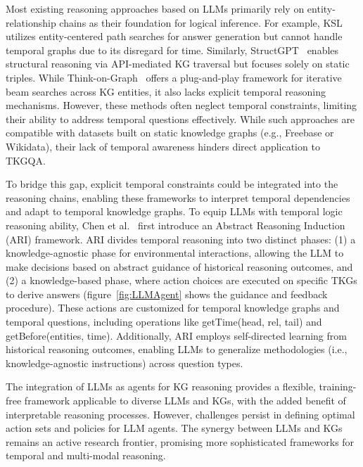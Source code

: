 Most existing reasoning approaches based on LLMs primarily rely on entity-relationship chains as their foundation for logical inference. For example,
KSL~\cite{fengKnowledgeSolverTeaching2023} utilizes entity-centered path searches for answer generation but cannot handle temporal graphs due to its disregard for time. Similarly, StructGPT~\cite{jiangStructGPTGeneralFramework2023a} enables structural reasoning via API-mediated KG traversal but focuses solely on static triples. While Think-on-Graph~\cite{sunThinkonGraphDeepResponsible2024} offers a plug-and-play framework for iterative beam searches across KG entities, it also lacks explicit temporal reasoning mechanisms. However, these methods often neglect temporal constraints, limiting their ability to address temporal questions effectively. While such approaches are compatible with datasets built on static knowledge graphs (e.g., Freebase or Wikidata), their lack of temporal awareness hinders direct application to TKGQA. 

To bridge this gap, explicit temporal constraints could be integrated into the reasoning chains, enabling these frameworks to interpret temporal dependencies and adapt to temporal knowledge graphs. 
To equip LLMs with temporal logic reasoning ability, Chen et al.~\cite{chen2023temporal,valero2023comparing} first introduce an Abstract Reasoning Induction (ARI) framework. ARI divides temporal reasoning into two distinct phases: (1) a knowledge-agnostic phase for environmental interactions, allowing the LLM to make decisions based on abstract guidance of historical reasoning outcomes, and (2) a knowledge-based phase, where action choices are executed on specific TKGs to derive answers (figure~\ref{fig:LLMAgent} shows the guidance and feedback procedure).
These actions are customized for temporal knowledge graphs and temporal questions, including operations like getTime(head, rel, tail) and getBefore(entities, time). 
Additionally, ARI employs self-directed learning from historical reasoning outcomes, enabling LLMs to generalize methodologies (i.e., knowledge-agnostic instructions) across question types.

The integration of LLMs as agents for KG reasoning provides a flexible, training-free framework applicable to diverse LLMs and KGs, with the added benefit of interpretable reasoning processes. However, challenges persist in defining optimal action sets and policies for LLM agents. The synergy between LLMs and KGs remains an active research frontier, promising more sophisticated frameworks for temporal and multi-modal reasoning.

